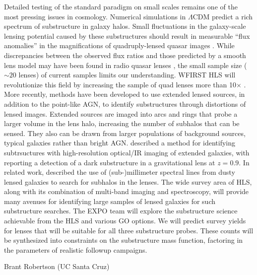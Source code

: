 \documentclass[11pt]{article}
\begin{document}
Detailed testing of the standard paradigm on small scales remains one of the most pressing issues
in cosmology. Numerical simulations in $\Lambda$CDM predict a rich spectrum of substructure in galaxy
halos. Small fluctuations in the galaxy-scale lensing potential caused by these substructures
should result in measurable “flux anomalies” in the magnifications of quadruply-lensed quasar
images \citep{metcalf2001a}. While discrepancies between the observed flux ratios and
those predicted by a smooth lens model may have been found in radio quasar lenses \citep{mao1998a,dalal2002a,metcalf2002a}, the small sample size ($\sim20$
lenses) of current samples limits our understanding. WFIRST HLS will revolutionize this field
by increasing the sample of quad lenses more than 10$\times$ \citep{oguri2010a}.
More recently, methods have been developed to use extended lensed sources, in addition to the
point-like AGN, to identify substructures through distortions of lensed images. Extended sources
are imaged into arcs and rings that probe a larger volume in the lens halo, increasing the number
of subhalos that can be sensed. They also can be drawn from larger populations of background
sources, typical galaxies rather than bright AGN. \cite[Vegetti \& Koopman (2009)][]{vegetti2009a} described a
method for identifying subtrsuctures with high-resolution optical/IR imaging of extended
galaxies, with \cite{vegetti2012a} reporting a detection of a dark substructure in a gravitational
lens at $z=0.9$. In related work, \cite{hezaveh2013a} described the use of (sub-)millimeter
spectral lines from dusty lensed galaxies to search for subhalos in the lenses. The wide survey
area of HLS, along with its combination of multi-band imaging and spectroscopy, will provide
many avenues for identifying large samples of lensed galaxies for such substructure searches.
The EXPO team will explore the substructure science achievable from the HLS and various GO
options. We will predict survey yields for lenses that will be suitable for all three substructure
probes. These counts will be synthesized into constraints on the substructure mass function,
factoring in the parameters of realistic followup campaigns.
\clearpage

\noindent %


\def\apj{\it{ApJ}}                  
\def\apjl{\it{ApJL}}
\def\mnras{\it{MNRAS}}
\def\nat{\it{Nature}}




\vspace{4in}


Brant Robertson (UC Santa Cruz)
\end{document}
